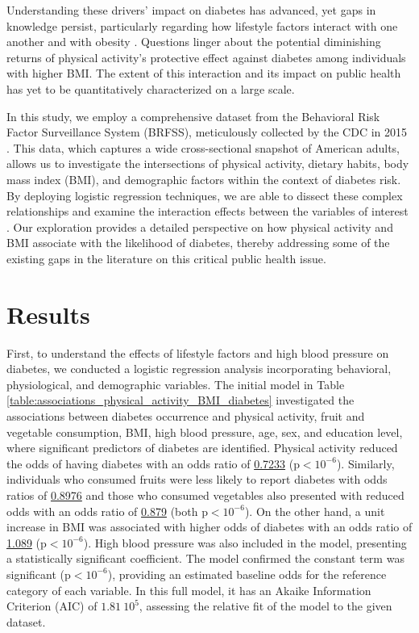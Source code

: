 \documentclass[11pt]{article}
\begin{document}
Understanding these drivers' impact on diabetes has advanced, yet gaps in knowledge persist, particularly regarding how lifestyle factors interact with one another and with obesity \cite{Reis2011LifestyleFA, Oort2020AssociationOC, Schnurr2020ObesityUL, Arsyad2022ModifiableRF}. Questions linger about the potential diminishing returns of physical activity's protective effect against diabetes among individuals with higher BMI. The extent of this interaction and its impact on public health has yet to be quantitatively characterized on a large scale.

In this study, we employ a comprehensive dataset from the Behavioral Risk Factor Surveillance System (BRFSS), meticulously collected by the CDC in 2015 \cite{Rolle-Lake2020BehavioralRF, Pierannunzi2013ASR}. This data, which captures a wide cross-sectional snapshot of American adults, allows us to investigate the intersections of physical activity, dietary habits, body mass index (BMI), and demographic factors within the context of diabetes risk. By deploying logistic regression techniques, we are able to dissect these complex relationships and examine the interaction effects between the variables of interest \cite{Menard1996AppliedLR, Peduzzi1996ASS}. Our exploration provides a detailed perspective on how physical activity and BMI associate with the likelihood of diabetes, thereby addressing some of the existing gaps in the literature on this critical public health issue.

\section*{Results}

First, to understand the effects of lifestyle factors and high blood pressure on diabetes, we conducted a logistic regression analysis incorporating behavioral, physiological, and demographic variables. The initial model in Table \ref{table:associations_physical_activity_BMI_diabetes} investigated the associations between diabetes occurrence and physical activity, fruit and vegetable consumption, BMI, high blood pressure, age, sex, and education level, where significant predictors of diabetes are identified. Physical activity reduced the odds of having diabetes with an odds ratio of \hyperlink{results0}{0.7233} (p$<$\hyperlink{A2d}{$10^{-6}$}). Similarly, individuals who consumed fruits were less likely to report diabetes with odds ratios of \hyperlink{results1}{0.8976} and those who consumed vegetables also presented with reduced odds with an odds ratio of \hyperlink{results2}{0.879} (both p$<$\hyperlink{A3d}{$10^{-6}$}). On the other hand, a unit increase in BMI was associated with higher odds of diabetes with an odds ratio of \hyperlink{results3}{1.089} (p$<$\hyperlink{A5d}{$10^{-6}$}). High blood pressure was also included in the model, presenting a statistically significant coefficient. The model confirmed the constant term was significant (p$<$\hyperlink{A1d}{$10^{-6}$}), providing an estimated baseline odds for the reference category of each variable. In this full model, it has an Akaike Information Criterion (AIC) of \hyperlink{R1b}{$1.81\ 10^{5}$}, assessing the relative fit of the model to the given dataset.
\end{document}
